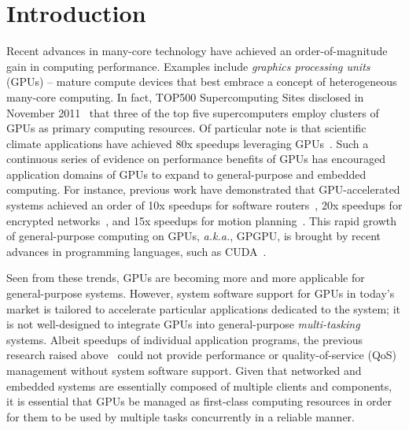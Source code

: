 \vspace{-0.25em}
\section{Introduction}
\label{sec:introduction}
\vspace{-0.25em}

Recent advances in many-core technology have achieved an
order-of-magnitude gain in computing performance.
Examples include \textit{graphics processing units} (GPUs) -- mature
compute devices that best embrace a concept of heterogeneous many-core
computing.
In fact, TOP500 Supercomputing Sites disclosed in November
2011~\cite{TOP500} that three of the top five supercomputers employ
clusters of GPUs as primary computing resources.
Of particular note is that scientific climate applications have achieved
80x speedups leveraging GPUs~\cite{Shimokawabe10}.
Such a continuous series of evidence on performance benefits of GPUs has
encouraged application domains of GPUs to expand to general-purpose and
embedded computing.
For instance, previous work have demonstrated that GPU-accelerated
systems achieved an order of 10x speedups for software
routers~\cite{Han_SIGCOMM10}, 20x speedups for encrypted
networks~\cite{Jang_NSDI11}, and 15x speedups for motion planning~\cite{McNaughton_ICRA11}.
This rapid growth of general-purpose computing on GPUs,
\textit{a.k.a.}, GPGPU, is brought by recent advances in programming
languages, such as CUDA~\cite{CUDA40}.

Seen from these trends, GPUs are becoming more and more applicable for
general-purpose systems.
However, system software support for GPUs in today's market is
tailored to accelerate particular applications dedicated to the
system; it is not well-designed to integrate GPUs into general-purpose
\textit{multi-tasking} systems.
Albeit speedups of individual application programs, the previous
research raised above~\cite{Han_SIGCOMM10, Jang_NSDI11,
McNaughton_ICRA11} could not provide performance or quality-of-service
(QoS) management without system software support.
Given that networked and embedded systems are essentially composed
of multiple clients and components, it is essential that GPUs be
managed as first-class computing resources in order for them to be
used by multiple tasks concurrently in a reliable manner.

